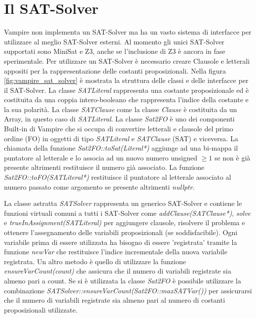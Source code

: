 \documentclass[./main.tex]{subfiles}
\begin{document}
\section{Il SAT-Solver} \label{sec:vampire_sat}
Vampire non implementa un SAT-Solver ma ha un vasto sistema di interfacce per utilizzare al meglio SAT-Solver esterni.
Al momento gli unici SAT-Solver supportati sono MiniSat e Z3, anche se l'inclusione di Z3 è ancora in fase sperimentale.
Per utilizzare un SAT-Solver è necessario creare Clausole e letterali appositi per la rappresentazione delle costanti proposizionali.
Nella figura \ref{fig:vampire_sat_solver} è mostrata la struttura delle classi e delle interfacce per il SAT-Solver.
La classe \textit{SATLiteral} rappresenta una costante proposizionale ed è costituita da una coppia intero-booleano che rappresenta
l'indice della costante e la sua polarità. 
La classe \textit{SATClause} come la classe \textit{Clause} è costituita da un Array, in questo caso di \textit{SATLiteral}.
La classe \textit{Sat2FO} è uno dei componenti Built-in di Vampire che si occupa di convertire letterali e clausole 
del primo ordine (FO) in oggetti di tipo \textit{SATLiteral} e \textit{SATClause} (SAT) e viceversa. 
La chiamata della funzione \textit{Sat2FO::toSat(Literal*)} aggiunge ad una bi-mappa il puntatore al letterale
e lo associa ad un nuovo numero unsigned $\geq 1$ se non è già presente altrimenti restituisce il numero già associato.
La funzione \textit{Sat2FO::toFO(SATLiteral*)} restituisce il puntatore al letterale associato al numero passato come argomento
se presente altrimenti \textit{nullptr}.

La classe astratta \textit{SATSolver} rappresenta un generico SAT-Solver e contiene le funzioni virtuali comuni a tutti i SAT-Solver 
come \textit{addClause(SATClause*)}, \textit{solve} e \textit{trueInAssignment(SATLiteral)} per 
aggiungere clausole, risolvere il problema e ottenere l'assegnamento delle variabili proposizionali (se soddisfacibile). 
Ogni variabile prima di essere utilizzata ha bisogno di essere 'registrata' tramite la funzione \textit{newVar} che restituisce
l'indice incrementale della nuova variabile registrata. Un altro metodo è quello di utilizzare la funzione \textit{ensureVarCount(count)} che 
assicura che il numero di variabili registrate sia almeno pari a count.
Se si è utilizzata la classe \textit{Sat2FO} è possibile utilizzare la combinazione \textit{SATSolver::ensureVarCount(Sat2FO::maxSATVar())}
per assicurarsi che il numero di variabili registrate sia almeno pari al numero di costanti proposizionali utilizzate.
\end{document}
